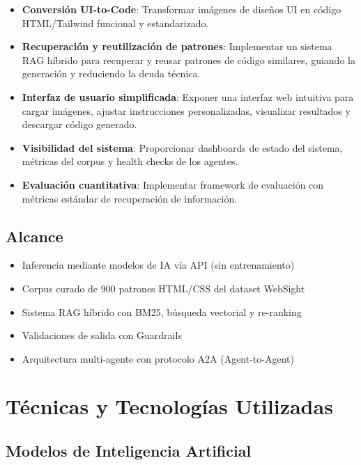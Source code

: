 \documentclass[12pt,a4paper]{article}
\begin{document}
\begin{itemize}[leftmargin=*]
    \item \textbf{Conversión UI-to-Code}: Transformar imágenes de diseños UI en código HTML/Tailwind funcional y estandarizado.
    
    \item \textbf{Recuperación y reutilización de patrones}: Implementar un sistema RAG híbrido para recuperar y reusar patrones de código similares, guiando la generación y reduciendo la deuda técnica.
    
    \item \textbf{Interfaz de usuario simplificada}: Exponer una interfaz web intuitiva para cargar imágenes, ajustar instrucciones personalizadas, visualizar resultados y descargar código generado.
    
    \item \textbf{Visibilidad del sistema}: Proporcionar dashboards de estado del sistema, métricas del corpus y health checks de los agentes.
    
    \item \textbf{Evaluación cuantitativa}: Implementar framework de evaluación con métricas estándar de recuperación de información.
\end{itemize}

\subsection{Alcance}

\begin{itemize}
    \item Inferencia mediante modelos de IA vía API (sin entrenamiento)
    \item Corpus curado de 900 patrones HTML/CSS del dataset WebSight
    \item Sistema RAG híbrido con BM25, búsqueda vectorial y re-ranking
    \item Validaciones de salida con Guardrails
    \item Arquitectura multi-agente con protocolo A2A (Agent-to-Agent)
\end{itemize}

\section{Técnicas y Tecnologías Utilizadas}

\subsection{Modelos de Inteligencia Artificial}
\end{document}
